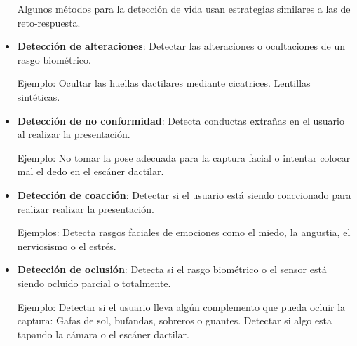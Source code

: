 \begin{itemize}
    Algunos métodos para la detección de vida usan estrategias similares a las de reto-respuesta.
    
    \item 
    \textbf{Detección de alteraciones}: Detectar las alteraciones o ocultaciones de un rasgo biométrico.
    
    Ejemplo: Ocultar las huellas dactilares mediante cicatrices. Lentillas sintéticas.
    \item 
    \textbf{Detección de no conformidad}: Detecta conductas extrañas en el usuario al realizar la presentación. 
    
    Ejemplo: No tomar la pose adecuada para la captura \gls{facial} o intentar colocar mal el dedo en el escáner \gls{dactilar}.
    \item 
    \textbf{Detección de coacción}: Detectar si el usuario está siendo coaccionado para realizar realizar la presentación. 
    
    Ejemplos: Detecta rasgos faciales de emociones como el miedo, la angustia, el nerviosismo o el estrés. 
    \item 
    \textbf{Detección de oclusión}: Detecta si el rasgo biométrico o el sensor está siendo ocluido parcial o totalmente. 
    
    Ejemplo: Detectar si el usuario lleva algún complemento que pueda ocluir la captura: Gafas de sol, bufandas, sobreros o guantes. Detectar si algo esta tapando la cámara o el escáner dactilar.
\end{itemize}
    
